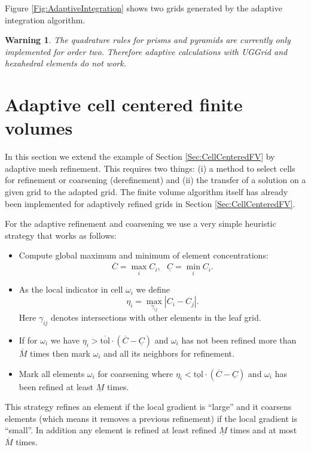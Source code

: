 \documentclass[11pt,a4paper,headinclude,footinclude,DIV16,headings=normal]{scrreprt}
\newtheorem{warn}[exc]{Warning}
\begin{document}
Figure \ref{Fig:AdaptiveIntegration} shows two grids generated by the
adaptive integration algorithm.

\begin{warn} The quadrature rules for prisms and pyramids are
  currently only implemented for order two. Therefore adaptive
  calculations with UGGrid and hexahedral elements do not work.
\end{warn}



\section{Adaptive cell centered finite volumes}

In this section we extend the example of Section
\ref{Sec:CellCenteredFV} by adaptive mesh refinement. This requires
two things: (i) a method to select cells for refinement or coarsening
(derefinement) and (ii) the transfer of a solution on a given grid to
the adapted grid. The finite volume algorithm itself has already been
implemented for adaptively refined grids in Section
\ref{Sec:CellCenteredFV}.

For the adaptive refinement and coarsening we use a very simple
heuristic strategy that works as follows:
\begin{itemize}
\item Compute global maximum and minimum of element concentrations:
  $$\overline{C}=\max_i C_i,  \ \ \ \underline{C}=\min_i C_i.$$
\item As the local indicator in cell $\omega_i$ we define $$\eta_i =
  \max_{\gamma_{ij}} |C_i-C_j|.$$ Here $\gamma_{ij}$ denotes
  intersections with other elements in the leaf grid.
\item If for $\omega_i$ we have
  $\eta_i>\overline{\text{tol}}\cdot (\overline{C}-\underline{C})$
  and $\omega_i$ has not been refined more than $\overline{M}$ times
  then mark $\omega_i$ and all its neighbors for refinement.
\item Mark all elements $\omega_i$ for coarsening where
  $\eta_i<\underline{\text{tol}}\cdot (\overline{C}-\underline{C})$
  and $\omega_i$ has been refined at least $\underline{M}$ times.
\end{itemize}

This strategy refines an element if the local gradient is ``large''
and it coarsens elements (which means it removes a previous
refinement) if the local gradient is ``small''. In addition any
element is refined at least refined $\underline{M}$ times and at most
$\overline{M}$ times.
\end{document}
